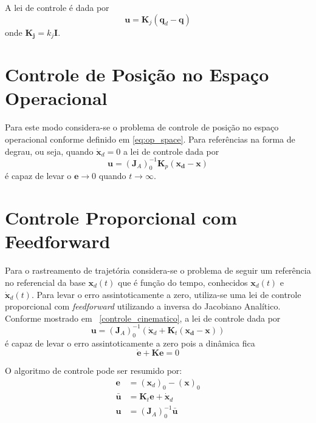 A lei de controle é dada por 
\begin{equation}
\bm{u} = \bm{K}_j (\bm{q}_d - \bm{q})
\end{equation}
onde $\bm{K_j} = k_j \bm{I}$.

\section{Controle de Posição no Espaço Operacional} \label{sec:pos_operacional}
Para este modo considera-se o problema de controle de posição no espaço operacional conforme definido em \ref{eq:op_space}. Para referências na forma de degrau, ou seja, quando $\dot{\bm{x}}_d = 0$ a lei de controle dada por
\begin{equation} \label{eq:lei_posicao}
\bm{u} = (\bm{J}_{A})_0^{-1} \bm{K}_p (\bm{x_d} - \bm{x})
\end{equation}
é capaz de levar o $\bm{e} \rightarrow 0$ quando $t \rightarrow \infty$.

\section{Controle Proporcional com Feedforward}
Para o rastreamento de trajetória considera-se o problema de seguir um referência no referencial da base $\bm{x}_d(t)$ que é função do tempo, conhecidos $\bm{x}_d(t)$ e $\bm{\dot{x}}_d(t)$. Para levar o erro assintoticamente a zero, utiliza-se uma lei de controle proporcional com \textit{feedforward} utilizando a inversa do Jacobiano Analítico. Conforme mostrado em ~\ref{controle_cinematico}, a lei de controle dada por 
\begin{equation}
\bm{u} = (\bm{J}_{A})_0^{-1} (\dot{\bm{x}}_d + \bm{K}_t (\bm{x_d} - \bm{x}))
\end{equation} 
é capaz de levar o erro assintoticamente a zero pois a dinâmica fica 
\begin{equation}
\dot{\bm{e}} + \bm{K} \bm{e} = 0
\end{equation}

O algoritmo de controle pode ser resumido por:
\begin{align}
\bm{e} &= (\bm{x}_d)_0 - (\bm{x})_0  \label{eq:error_pf}\\
\bm{\bar{u}} &= \bm{K}_t \bm{e} + \bm{\dot{x}}_d \\
\bm{u} &= (\bm{J}_A)_0^{-1} \bm{\bar{u}}
\end{align}


